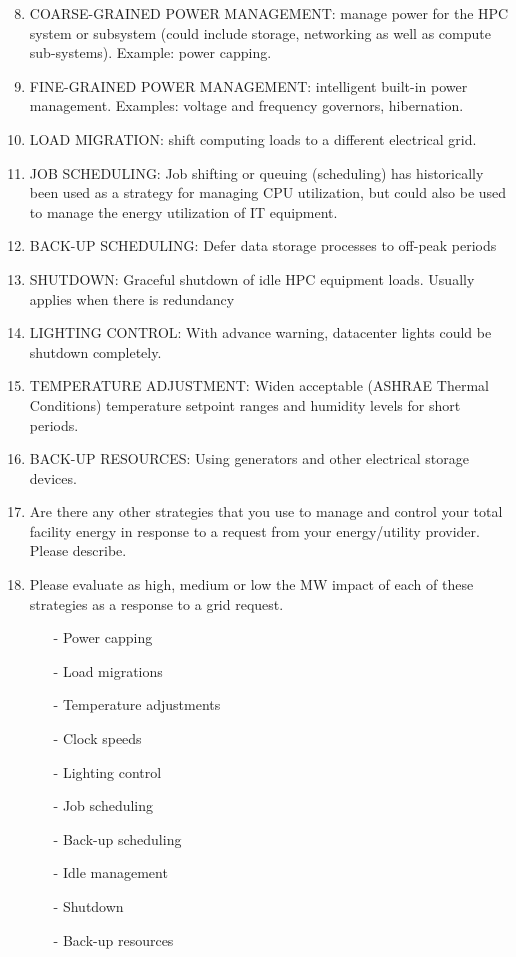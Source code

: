 \begin {enumerate} %
\setcounter{enumi}{7}
\item
COARSE-GRAINED POWER MANAGEMENT: manage power for the HPC system or subsystem 
(could include storage, networking as well as compute sub-systems). Example: power capping.

\item
FINE-GRAINED POWER MANAGEMENT: intelligent built-in power management. 
Examples: voltage and frequency governors, hibernation.

\item
LOAD MIGRATION: shift computing loads to a different electrical grid. 

\item
JOB SCHEDULING: Job shifting or queuing (scheduling) has historically been used 
as a strategy for managing CPU utilization, but could also be used to manage the 
energy utilization of IT equipment.

\item
BACK-UP SCHEDULING: Defer data storage processes to off-peak periods 

\item
SHUTDOWN: Graceful shutdown of idle HPC equipment loads. Usually applies when there is redundancy

\item
LIGHTING CONTROL: With advance warning, datacenter lights could be shutdown completely.

\item
TEMPERATURE ADJUSTMENT: Widen acceptable (ASHRAE Thermal Conditions) temperature setpoint 
ranges and humidity levels for short periods. 

\item
BACK-UP RESOURCES: Using generators and other electrical storage devices.

\item
Are there any other strategies that you use to manage and control your total 
facility energy in response to a request from your energy/utility provider.
Please describe.

\item
Please evaluate as high, medium or low the MW impact of each of these strategies 
as a response to a grid request. 

\begin{itemize} %
\item[{-}]
Power capping 
\item[{-}]
Load migrations	
\item[{-}]
Temperature adjustments	
\item[{-}]
Clock speeds	
\item[{-}]
Lighting control	
\item[{-}]
Job scheduling	
\item[{-}]
Back-up scheduling	
\item[{-}]
Idle management	
\item[{-}]
Shutdown	
\item[{-}]
Back-up resources	
\end{itemize}
\end{enumerate}

